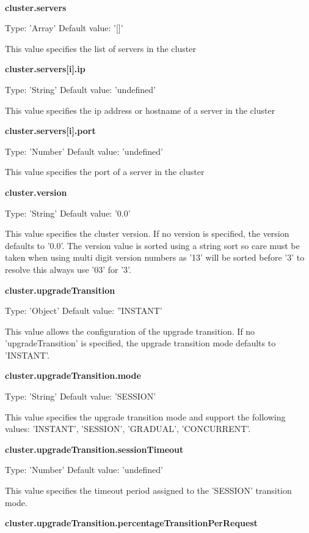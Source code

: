 \documentclass[a4paper,11pt,twoside]{article}
\begin{document}
\noindent\\
\textbf{cluster.servers}

\noindent
Type: 'Array'  Default value: '[]'\smallskip

\noindent
This value specifies the list of servers in the cluster\bigskip

\noindent
\textbf{cluster.servers[i].ip}

\noindent
Type: 'String' Default value: 'undefined'\smallskip

\noindent
This value specifies the ip address or hostname of a server in the cluster\bigskip

\noindent
\textbf{cluster.servers[i].port}

\noindent
Type: 'Number' Default value: 'undefined'\smallskip

\noindent
This value specifies the port of a server in the cluster\bigskip

\noindent
\textbf{cluster.version}

\noindent
Type: 'String' Default value: '0.0'\smallskip

\noindent
This value specifies the cluster version. If no version is specified, the version defaults to '0.0'.  The version value is sorted using a string sort so care must be taken when using multi digit version numbers as '13' will be sorted before '3' to resolve this always use '03' for '3'. \bigskip

\noindent
\textbf{cluster.upgradeTransition}

\noindent
Type: 'Object' Default value: ''INSTANT'\smallskip

\noindent
This value allows the configuration of the upgrade transition. If no 'upgradeTransition' is specified, the upgrade transition mode defaults to 'INSTANT'.\bigskip

\noindent
\textbf{cluster.upgradeTransition.mode}

\noindent
Type: 'String' Default value: 'SESSION'\smallskip

\noindent
This value specifies the upgrade transition mode and support the following values: 'INSTANT', 'SESSION', 'GRADUAL', 'CONCURRENT'.\bigskip

\noindent
\textbf{cluster.upgradeTransition.sessionTimeout}

\noindent
Type: 'Number' Default value: 'undefined'\smallskip

\noindent
This value specifies the timeout period assigned to the 'SESSION' transition mode. \bigskip

\noindent
\textbf{cluster.upgradeTransition.percentageTransitionPerRequest}
\end{document}

